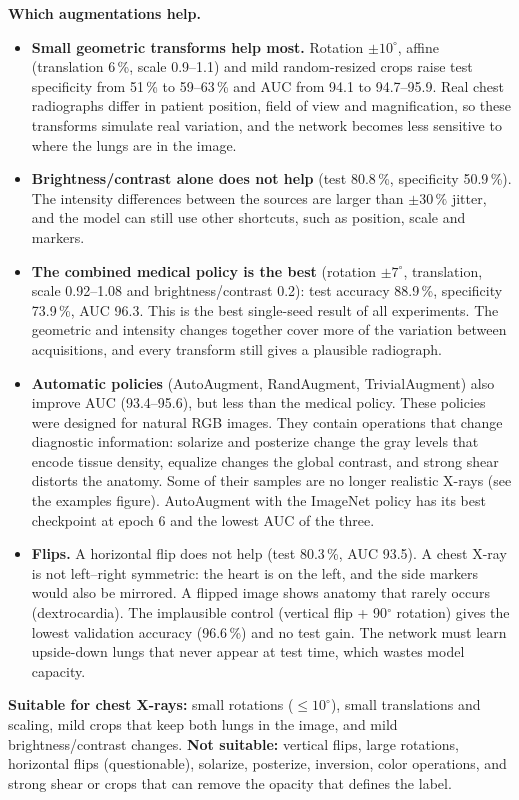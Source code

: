 \documentclass[10pt]{article}
\begin{document}
\textbf{Which augmentations help.}
\begin{itemize}
\item \textbf{Small geometric transforms help most.} Rotation $\pm10^\circ$, affine (translation 6\,\%, scale 0.9--1.1) and mild random-resized crops raise test specificity from 51\,\% to 59--63\,\% and AUC from 94.1 to 94.7--95.9.
 Real chest radiographs differ in patient position, field of view and magnification, so these transforms simulate real variation, and the network becomes less sensitive to where the lungs are in the image.
\item \textbf{Brightness/contrast alone does not help} (test 80.8\,\%, specificity 50.9\,\%).
 The intensity differences between the sources are larger than $\pm30\,\%$ jitter, and the model can still use other shortcuts, such as position, scale and markers.
\item \textbf{The combined medical policy is the best} (rotation $\pm7^\circ$, translation, scale 0.92--1.08 and brightness/contrast 0.2): test accuracy 88.9\,\%, specificity 73.9\,\%, AUC 96.3.
 This is the best single-seed result of all experiments.
 The geometric and intensity changes together cover more of the variation between acquisitions, and every transform still gives a plausible radiograph.
\item \textbf{Automatic policies} (AutoAugment, RandAugment, TrivialAugment) also improve AUC (93.4--95.6), but less than the medical policy.
 These policies were designed for natural RGB images. They contain operations that change diagnostic information: solarize and posterize change the gray levels that encode tissue density, equalize changes the global contrast, and strong shear distorts the anatomy.
 Some of their samples are no longer realistic X-rays (see the examples figure).
 AutoAugment with the ImageNet policy has its best checkpoint at epoch 6 and the lowest AUC of the three.
\item \textbf{Flips.} A horizontal flip does not help (test 80.3\,\%, AUC 93.5).
 A chest X-ray is not left--right symmetric: the heart is on the left, and the side markers would also be mirrored. A flipped image shows anatomy that rarely occurs (dextrocardia).
 The implausible control (vertical flip + 90$^\circ$ rotation) gives the lowest validation accuracy (96.6\,\%) and no test gain. The network must learn upside-down lungs that never appear at test time, which wastes model capacity.
\end{itemize}
\textbf{Suitable for chest X-rays:} small rotations ($\le 10^\circ$), small translations and scaling, mild crops that keep both lungs in the image, and mild brightness/contrast changes.
\textbf{Not suitable:} vertical flips, large rotations, horizontal flips (questionable), solarize, posterize, inversion, color operations, and strong shear or crops that can remove the opacity that defines the label.
\end{document}
